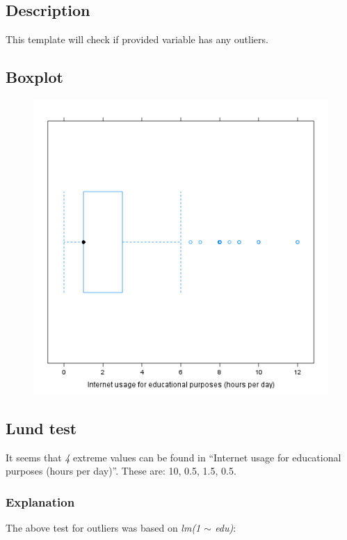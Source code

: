 \documentclass[]{article}
\makeatletter
\def\maxwidth{\ifdim\Gin@nat@width>\linewidth\linewidth
\else\Gin@nat@width\fi}
\let\Oldincludegraphics\includegraphics
\renewcommand{\includegraphics}[1]{\Oldincludegraphics[width=\maxwidth]{#1}}
\makeatother
\begin{document}
\subsection{Description}

This template will check if provided variable has any outliers.

\subsection{Boxplot}

\begin{figure}[htbp]
\centering
\includegraphics{d24b3eb41da4d1de21d4bce0e30d2e1b.png}
\caption{}
\end{figure}

\subsection{Lund test}

It seems that \emph{4} extreme values can be found in ``Internet usage
for educational purposes (hours per day)''. These are: 10, 0.5, 1.5,
0.5.

\subsubsection{Explanation}

The above test for outliers was based on \emph{lm(1 \ensuremath{\sim}
edu)}:
\end{document}
